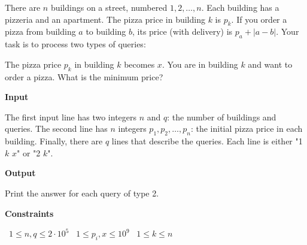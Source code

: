 There are $n$ buildings on a street, numbered $1,2,\dots,n$. Each building has a pizzeria and an apartment.
The pizza price in building $k$ is $p_k$. If you order a pizza from building $a$ to building $b$, its price (with delivery) is $p_a+|a-b|$.
Your task is to process two types of queries:

The pizza price $p_k$ in building $k$ becomes $x$.
You are in building $k$ and want to order a pizza. What is the minimum price?

\vspace{0.3cm}\noindent\textbf{Input}

The first input line has two integers $n$ and $q$: the number of buildings and queries.
The second line has $n$ integers $p_1,p_2,\dots,p_n$: the initial pizza price in each building.
Finally, there are $q$ lines that describe the queries. Each line is either "1 $k$ $x$" or "2 $k$".

\vspace{0.3cm}\noindent\textbf{Output}

Print the answer for each query of type 2.

\vspace{0.3cm}\noindent\textbf{Constraints}

\textbullet\ $1 \le n,q \le 2 \cdot 10^5$
\textbullet\ $1 \le p_i, x \le 10^9$
\textbullet\ $1 \le k \le n$